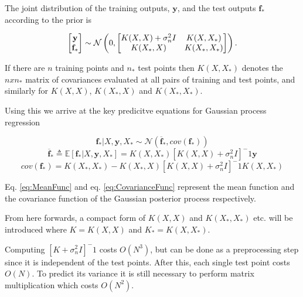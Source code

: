 \documentclass[12pt,a4paper]{report}
\theoremstyle{definition}
\begin{document}
The joint distribution of the training outputs, $\textbf{y}$, and the test outputs $\textbf{f}_{*}$ according to the prior is 

\begin{equation}
	\centering
	\begin{bmatrix}
		\textbf{y} \\
		\textbf{f}_{*}
	\end{bmatrix}
	\sim \mathcal{N} \left( 0,
	\begin{bmatrix}
		K(X, X) + \sigma_{n}^2I & K(X, X_{*}) \\
		K(X_{*},  X) & K(X_{*},  X_{*})
	\end{bmatrix} \right) .
	\label{eq:JointPriorDist}
\end{equation}

If there are $n$ training points and $n_{*}$ test points then $K(X, X_{*})$ denotes the $n x n_{*}$ matrix of covariances evaluated at all pairs of training and test points, and similarly for $K(X, X)$, $K(X_{*},  X)$ and $K(X_{*},  X_{*})$.

Using this we arrive at the key predicitve equations for Gaussian process regression

\begin{equation}
	\textbf{f}_{*} | X, \textbf{y}, X_{*} \sim \mathcal{N}(\overline{\textbf{f}}_{*}, cov(\textbf{f}_{*}))
\end{equation}
\begin{equation}
	\overline{\textbf{f}}_{*} \triangleq \mathbb{E}[\textbf{f}_{*} | X, \textbf{y}, X_{*}] = K(X, X_{*})[K(X, X) +  \sigma_{n}^2I]^-1 \textbf{y}
	\label{eq:MeanFunc}
\end{equation}
\begin{equation}
	cov(\textbf{f}_{*}) = K(X_{*}, X_{*}) - K(X_{*}, X)[K(X, X) +  \sigma_{n}^2I]^-1 K(X, X_{*})
	\label{eq:CovarianceFunc}
\end{equation}

Eq. \ref{eq:MeanFunc} and eq. \ref{eq:CovarianceFunc} represent the mean function and the covariance function of the Gaussian posterior process respectively. 

From here forwards, a compact form of $K(X, X)$ and $K(X_{*}, X_{*})$ etc. will be introduced where $K = K(X, X)$ and $K_{*} = K(X, X_{*})$.

Computing $[K + \sigma_{n}^2I]^-1$ costs $O(N^3)$, but can be done as a preprocessing step since it is independent of the test points. 
After this, each single test point costs $O(N)$. 
To predict its variance it is still necessary to perform matrix multiplication which costs $O(N^2)$.
\end{document}
